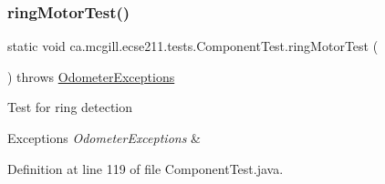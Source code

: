 \subsubsection{\texorpdfstring{ring\+Motor\+Test()}{ringMotorTest()}}
{\footnotesize\ttfamily static void ca.\+mcgill.\+ecse211.\+tests.\+Component\+Test.\+ring\+Motor\+Test (\begin{DoxyParamCaption}{ }\end{DoxyParamCaption}) throws \hyperlink{classca_1_1mcgill_1_1ecse211_1_1odometer_1_1_odometer_exceptions}{Odometer\+Exceptions}\hspace{0.3cm}{\ttfamily [static]}}

Test for ring detection


\begin{DoxyExceptions}{Exceptions}
{\em Odometer\+Exceptions} & \\
\hline
\end{DoxyExceptions}


Definition at line 119 of file Component\+Test.\+java.


